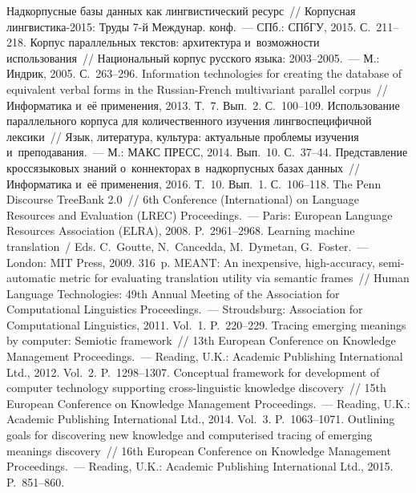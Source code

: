 \begin{multicols}{2}
{{\begin{thebibliography}{99}
Надкорпусные базы данных как лингвистический ресурс~// Корпусная 
лингвистика-2015: Труды 7-й Междунар. конф.~--- СПб.: СПбГУ, 2015. 
С.~211--218.
 Корпус параллельных 
текстов: архитектура и~возможности использования~// Национальный корпус 
русского языка: 2003--2005.~--- М.: Индрик, 2005. С.~263--296.
 Information 
technologies for creating the database of equivalent verbal forms in the  
Russian-French multivariant parallel corpus~// Информатика и~её применения, 
2013. Т.~7. Вып.~2. С.~100--109.
 Использование параллельного корпуса для 
количественного изучения лингвоспецифичной лексики~// Язык, литература, 
культура: актуальные проблемы изучения и~преподавания.~--- М.: МАКС 
ПРЕСС, 2014. Вып.~10. С.~37--44.
Представление кроссязыковых знаний о~коннекторах в~надкорпусных базах 
данных~// Информатика и~её применения, 2016. Т.~10. Вып.~1. С.~106--118.
 The Penn Discourse TreeBank 2.0~// 6th Conference (International) on 
Language Resources and Evaluation (LREC) Proceedings.~--- Paris: European 
Language Resources Association (ELRA), 2008. P.~2961--2968.
Learning machine translation~/ Eds. C.~Goutte, N.~Cancedda, M.~Dymetan, 
G.~Foster.~---  London: MIT Press, 2009. 316~p.
 MEANT: An inexpensive, high-accuracy, semi-automatic metric 
for evaluating translation utility via semantic frames~// Human Language 
Technologies: 49th Annual Meeting of the Association for Computational Linguistics 
Proceedings.~---  Stroudsburg: Association for Computational Linguistics, 2011. 
Vol.~1. P.~220--229.
 Tracing emerging meanings by computer: Semiotic 
framework~//  13th European Conference on Knowledge Management 
Proceedings.~---  Reading, U.K.: Academic Publishing International Ltd., 2012. 
Vol.~2. P.~1298--1307.
Conceptual framework for development of computer technology supporting  
cross-linguistic knowledge discovery~// 15th European Conference on Knowledge 
Management Proceedings.~---  Reading, U.K.: Academic Publishing International Ltd., 
2014. Vol.~3. P.~1063--1071.
 Outlining goals for discovering new knowledge and 
computerised tracing of emerging meanings discovery~//  16th European Conference 
on Knowledge Management Proceedings.~--- Reading, U.K.: Academic Publishing 
International Ltd., 2015. P.~851--860.


\end{thebibliography}}}
\end{multicols}
